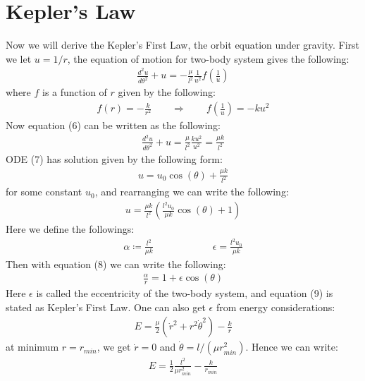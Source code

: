 \documentclass[11pt,oneside]{book}
\theoremstyle{break}
\theoremstyle{break}
\begin{document}
\newpage
\section[Kepler's Law]{\color{red}Kepler's Law\color{black}}
Now we will derive the Kepler's First Law, the orbit equation under gravity. First we let $u = 1/r$, the equation of motion for two-body system gives the following:
\begin{align*}
\frac{d^2 u}{d\theta^2} + u = -\frac{\mu}{l^2}\frac{1}{u^2} f\left( \frac{1}{u}\right) \tag{6}
\end{align*}
where $f$ is a function of $r$ given by the following:
\begin{align*}
f(r) = -\frac{k}{r^2} \qquad \Rightarrow \qquad f\left( \frac{1}{u}\right) = -ku^2
\end{align*}
Now equation (6) can be written as the following:
\begin{align*}
\frac{d^2 u}{d\theta^2} + u = \frac{\mu}{l^2}\frac{ku^2}{u^2} = \frac{\mu k}{l^2}  \tag{7}
\end{align*}
ODE (7) has solution given by the following form:
\begin{align*}
u = u_0 \cos(\theta) + \frac{\mu k}{l^2}
\end{align*}
for some constant $u_0$, and rearranging we can write the following:
\begin{align*}
u = \frac{\mu k}{l^2}\left( \frac{l^2 u_0}{\mu k}\cos(\theta) + 1\right) \tag{8}
\end{align*}
Here we define the followings:
\begin{align*}
\alpha \coloneqq \frac{l^2}{\mu k} \qquad \qquad \qquad \epsilon = \frac{l^2 u_0}{\mu k}
\end{align*}
Then with equation (8) we can write the following:
\begin{align*}
\frac{\alpha}{r} = 1+\epsilon \cos(\theta) \tag{9}
\end{align*}
Here $\epsilon$ is called the eccentricity of the two-body system, and equation (9) is stated as Kepler's First Law. One can also get $\epsilon$ from energy considerations:
\begin{align*}
E = \frac{\mu}{2}\left( \dot{r}^2 + r^2 \dot{\theta}^2\right) - \frac{k}{r}
\end{align*}
at minimum $r = r_{min}$, we get $\dot{r} = 0$ and $\dot{\theta} = l/(\mu r_{min}^2)$. Hence we can write:
\begin{align*}
E = \frac{1}{2}\frac{l^2}{\mu r_{min}^2} - \frac{k}{r_{min}}
\end{align*}
\end{document}
